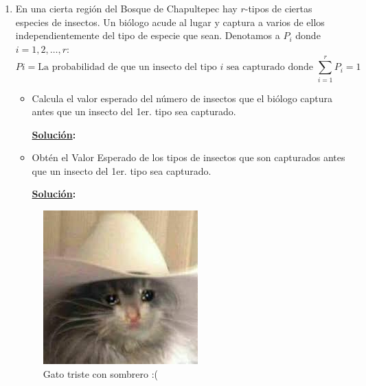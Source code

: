\documentclass[11pt,letterpaper]{report}
\newcommand{\sol}{\textbf{\underline{Solución}: }} %
\begin{document}
\begin{enumerate}
\item En una cierta región del Bosque de Chapultepec hay $r$-tipos de ciertas especies de insectos.
Un biólogo acude al lugar y captura a varios de ellos independientemente del tipo de especie que
sean. Denotamos a $P_i$ donde $i = 1,2,\ldots,r$:
\[
    Pi = \text{La probabilidad de que un insecto del tipo $i$ sea capturado donde } \sum_{i=1}^r P_i = 1
\]
\begin{itemize}
    \item Calcula el valor esperado del número de insectos que el biólogo captura antes que un
    insecto del 1er. tipo sea capturado.

    \sol

    \item Obtén el Valor Esperado de los tipos de insectos que son capturados antes que un insecto
    del 1er. tipo sea capturado.

    \sol
\end{itemize}


\begin{figure}[H]
    \centering
    \includegraphics[scale=0.5]{triste.jpg}
    \caption{Gato triste con sombrero :(}
\end{figure}


\end{enumerate}



\end{document}
